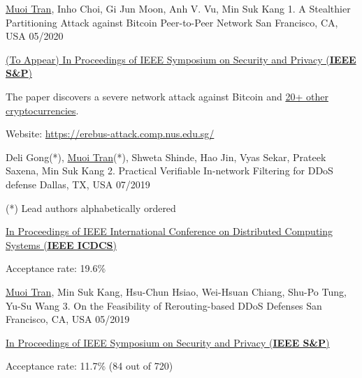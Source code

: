 


\begin{cventries}

  \cventry
    {\underline{Muoi Tran}, Inho Choi, Gi Jun Moon, Anh V. Vu, Min Suk Kang} %
    {1. A Stealthier Partitioning Attack against Bitcoin Peer-to-Peer Network} %
    {San Francisco, CA, USA} %
    {05/2020} %
    {
      \begin{cvitems} %
        \item {\href{https://www.ieee-security.org/TC/SP2020/}{(To Appear) In Proceedings of IEEE Symposium on Security and Privacy (\textbf{IEEE S\&P})}}
        \item The paper discovers a severe network attack against Bitcoin and \href{https://erebus-attack.comp.nus.edu.sg/}{20+ other cryptocurrencies}.
        \item Website: \url{https://erebus-attack.comp.nus.edu.sg/}
      \end{cvitems}
    }

  \cventry
    {Deli Gong(*), \underline{Muoi Tran}(*), Shweta Shinde, Hao Jin, Vyas Sekar, Prateek Saxena, Min Suk Kang} %
    {2. Practical Verifiable In-network Filtering for DDoS defense} %
    {Dallas, TX, USA}
    {07/2019}
    {
      \begin{cvitems} %
        \item {(*) Lead authors alphabetically ordered}
        \item {\href{https://theory.utdallas.edu/ICDCS2019/}{In Proceedings of IEEE International Conference on Distributed Computing Systems (\textbf{IEEE ICDCS})}}
        \item {Acceptance rate: 19.6\%}
      \end{cvitems}
    }

  \cventry
    {\underline{Muoi Tran}, Min Suk Kang, Hsu-Chun Hsiao, Wei-Hsuan Chiang, Shu-Po Tung, Yu-Su Wang} %
    {3. On the Feasibility of Rerouting-based DDoS Defenses } %
    {San Francisco, CA, USA} %
    {05/2019} %
    {
      \begin{cvitems} %
        \item {\href{https://www.ieee-security.org/TC/SP2019/}{In Proceedings of IEEE Symposium on Security and Privacy (\textbf{IEEE S\&P})}}
        \item {Acceptance rate: 11.7\% (84 out of 720) }
      \end{cvitems}
    }


\end{cventries}
